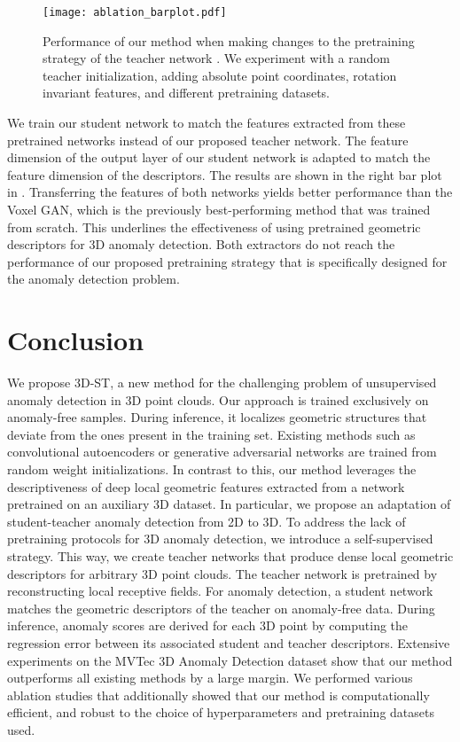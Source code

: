\documentclass[twoside,11pt]{article}
\newcommand{\methodname}{{3D-ST}}
\begin{document}
 \begin{figure}[t]
    \centering
    \texttt{[image: ablation\_barplot.pdf]}
    \caption{Performance of our method when making changes to the pretraining strategy of the teacher network . We experiment with a random teacher initialization, adding absolute point coordinates, rotation invariant features, and different pretraining datasets.}
    \label{fig:ablation_barplot}
\end{figure}
 
We train our student network to match the features extracted from these pretrained networks instead of our proposed teacher network. The feature dimension of the output layer of our student network is adapted to match the feature dimension of the descriptors. The results are shown in the right bar plot in . Transferring the features of both networks yields better performance than the Voxel GAN, which is the previously best-performing method that was trained from scratch. This underlines the effectiveness of using pretrained geometric descriptors for 3D anomaly detection. Both extractors do not reach the performance of our proposed pretraining strategy that is specifically designed for the anomaly detection problem.

\section{Conclusion}
We propose \methodname{}, a new method for the challenging problem of unsupervised anomaly detection in 3D point clouds. Our approach is trained exclusively on anomaly-free samples. During inference, it localizes geometric structures that deviate from the ones present in the training set. 
Existing methods such as convolutional autoencoders or generative adversarial networks are trained from random weight initializations.
In contrast to this, our method leverages the descriptiveness of deep local geometric features extracted from a network pretrained on an auxiliary 3D dataset. 
In particular, we propose an adaptation of student-teacher anomaly detection from 2D to 3D. To address the lack of pretraining protocols for 3D anomaly detection, we introduce a self-supervised strategy. This way, we create teacher networks that produce dense local geometric descriptors for arbitrary 3D point clouds. The teacher network is pretrained by reconstructing local receptive fields. For anomaly detection, a student network matches the geometric descriptors of the teacher on anomaly-free data. During inference, anomaly scores are derived for each 3D point by computing the regression error between its associated student and teacher descriptors. Extensive experiments on the MVTec 3D Anomaly Detection dataset show that our method outperforms all existing methods by a large margin. We performed various ablation studies that additionally showed that our method is computationally efficient, and robust to the choice of hyperparameters and pretraining datasets used.
\end{document}
